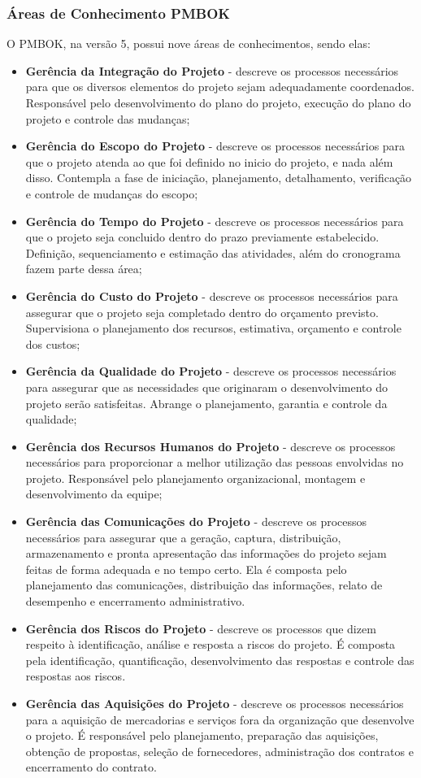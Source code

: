 \subsubsection{Áreas de Conhecimento PMBOK}

O PMBOK, na versão 5, possui nove áreas de conhecimentos, sendo elas:

\begin{itemize}
	\item \textbf{Gerência da Integração do Projeto} - descreve os processos necessários para que os diversos elementos do projeto sejam adequadamente coordenados. Responsável pelo desenvolvimento do plano do projeto, execução do plano do projeto e controle das mudanças;
	\item \textbf{Gerência do Escopo do Projeto} - descreve os processos necessários para que o projeto atenda ao que foi definido no inicio do projeto, e nada além disso. Contempla a fase de iniciação, planejamento, detalhamento, verificação e controle de mudanças do escopo;
	\item \textbf{Gerência do Tempo do Projeto} - descreve os processos necessários para que o projeto seja concluido dentro do prazo previamente estabelecido. Definição, sequenciamento e estimação das atividades, além do cronograma fazem parte dessa área;
	\item \textbf{Gerência do Custo do Projeto} - descreve os processos necessários para assegurar que o projeto seja completado dentro do orçamento previsto. Supervisiona o planejamento dos recursos, estimativa, orçamento e controle dos custos;
	\item \textbf{Gerência da Qualidade do Projeto} - descreve os processos necessários para assegurar que as necessidades que originaram o desenvolvimento do projeto serão
	satisfeitas. Abrange o planejamento, garantia e controle da qualidade;
	\item \textbf{Gerência dos Recursos Humanos do Projeto} - descreve os processos necessários para proporcionar a melhor utilização das pessoas envolvidas no projeto. Responsável pelo planejamento organizacional, montagem e desenvolvimento da equipe;
	\item \textbf{Gerência das Comunicações do Projeto} - descreve os processos necessários para assegurar que a geração, captura, distribuição, armazenamento e pronta apresentação das informações do projeto sejam feitas de forma adequada e no tempo certo. Ela é composta pelo planejamento das comunicações, distribuição das
	informações, relato de desempenho e encerramento administrativo.
	\item \textbf{Gerência dos Riscos do Projeto} - descreve os processos que dizem respeito à identificação, análise e resposta a riscos do projeto. É composta pela identificação, quantificação, desenvolvimento das respostas e controle das respostas aos riscos.
	\item \textbf{Gerência das Aquisições do Projeto} - descreve os processos necessários para a aquisição de mercadorias e serviços fora da organização que desenvolve o projeto. É responsável pelo planejamento, preparação das aquisições, obtenção de propostas, seleção de fornecedores, administração dos contratos e encerramento do contrato.
\end{itemize}

